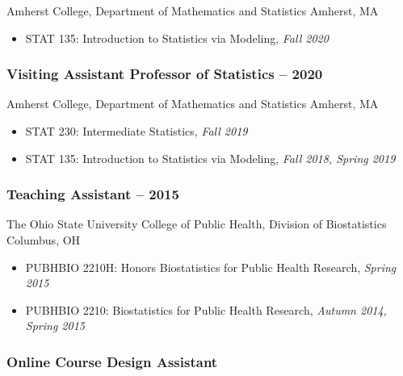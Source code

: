 \documentclass[
  fleqn, oneside]{article}
\providecommand{\tightlist}{%
  \setlength{\itemsep}{0pt}\setlength{\parskip}{0pt}}
\begin{document}
Amherst College, Department of Mathematics and Statistics \newline
Amherst, MA

\begin{itemize}
\tightlist
\item
  STAT 135: Introduction to Statistics via Modeling, \emph{Fall 2020}
\end{itemize}

\hypertarget{visiting-assistant-professor-of-statistics-2018-2020}{%
\subsubsection{\texorpdfstring{Visiting Assistant Professor of
Statistics \hfill{} --
2020}{Visiting Assistant Professor of Statistics 2018 -- 2020}}\label{visiting-assistant-professor-of-statistics-2018-2020}}

Amherst College, Department of Mathematics and Statistics \newline
Amherst, MA

\begin{itemize}
\item
  STAT 230: Intermediate Statistics, \emph{Fall 2019}
\item
  STAT 135: Introduction to Statistics via Modeling, \emph{Fall 2018,
  Spring 2019}
\end{itemize}

\hypertarget{teaching-assistant-2014-2015}{%
\subsubsection{\texorpdfstring{Teaching Assistant \hfill{}
--
2015}{Teaching Assistant 2014 -- 2015}}\label{teaching-assistant-2014-2015}}

The Ohio State University College of Public Health, Division of
Biostatistics \newline Columbus, OH

\begin{itemize}
\tightlist
\item
  PUBHBIO 2210H: Honors Biostatistics for Public Health Research,
  \emph{Spring 2015}
\item
  PUBHBIO 2210: Biostatistics for Public Health Research, \emph{Autumn
  2014, Spring 2015}
\end{itemize}

\hypertarget{online-course-design-assistant-2014}{%
\subsubsection{\texorpdfstring{Online Course Design Assistant
\hfill{}}{Online Course Design Assistant 2014}}\label{online-course-design-assistant-2014}}
\end{document}

